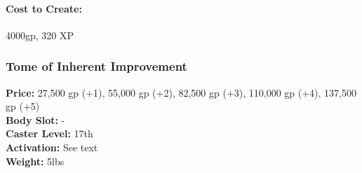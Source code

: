 \paragraph{Cost to Create:} 4000gp, 320 XP
% 
% 
% 
% 
% 
% 
\subsubsection{Tome of Inherent Improvement}
\textbf{Price:} 27,500 gp (+1), 55,000 gp (+2), 82,500 gp (+3), 110,000 gp (+4), 137,500 gp (+5)\\
\textbf{Body Slot:} -\\
\textbf{Caster Level:} 17th\\
\textbf{Activation:} See text\\
\textbf{Weight:} 5lbs

